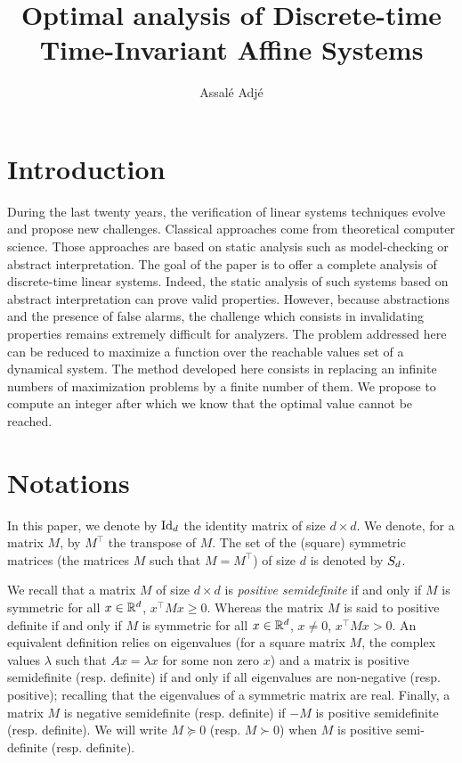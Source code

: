 \documentclass[10pt]{article}
\title{Optimal analysis of Discrete-time Time-Invariant Affine Systems}
\author{Assalé Adjé}
\date{}%
\begin{document}
\maketitle
\section{Introduction}
During the last twenty years,  the verification of linear systems techniques evolve and propose new challenges. Classical approaches come from theoretical computer science. Those approaches are based on static analysis such as model-checking or abstract interpretation. 
The goal of the paper is to offer a complete analysis of discrete-time linear systems.
Indeed, the static analysis of such systems based on abstract interpretation can prove 
valid properties. However, because abstractions and the presence of false alarms, the challenge which consists in invalidating properties remains extremely difficult for analyzers. The problem addressed here can be reduced to maximize a function over the reachable values set of a dynamical system.
The method developed here consists in replacing an infinite numbers of maximization problems by a finite number of them.  We propose to compute an integer after which we know that the optimal value cannot be reached.  
\section{Notations}
In this paper, we denote by $\operatorname{Id}_d$ the identity matrix of size $d\times d$. We denote, for a matrix $M$, by $M^\intercal$ the transpose of $M$. The set of the (square) symmetric matrices  (the matrices $M$ such that $M=M^\intercal$) of size $d$ is denoted by $S_d$.  

We recall that a matrix $M$ of size $d\times d$ is {\it positive semidefinite} if and only if $M$ is symmetric for all $x\in\mathbb R^d$,
$x^\intercal M x\geq 0$. Whereas the matrix $M$ is said to positive definite if and only if $M$ is symmetric for all $x\in\mathbb R^d$, $x\neq 0$, 
$x^\intercal M x>0$. An equivalent definition relies on eigenvalues (for a square matrix $M$, the complex values $\lambda$ such that $Ax=\lambda x$ for some non zero $x$) and a matrix is positive semidefinite (resp. definite) if and only if all eigenvalues are non-negative (resp. positive); recalling that the eigenvalues of a symmetric matrix are real.
Finally, a matrix $M$ is negative semidefinite (resp. definite) if $-M$ is positive semidefinite (resp. definite).
We will write $M\succeq 0$ (resp. $M\succ 0$)  when $M$ is positive semi-definite (resp. definite).
\end{document}
